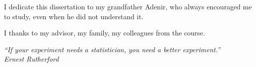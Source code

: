 \newpage

\begin{dedicatoria}
    \vspace*{\fill}
    \hfill
    \begin{minipage}{.6\textwidth}
        I dedicate this dissertation to my grandfather	Adenir, who always encouraged me to study, even
        when he did not understand it.
    \end{minipage}
\end{dedicatoria}
 
\begin{agradecimentos}
	I thanks to my advisor, my family, my colleagues from the course.  
\end{agradecimentos}

\begin{epigrafe}
\vspace*{\fill}

\begin{flushright}
    \hspace{7.5cm}
    \textit{
        ``If your experiment needs a statistician, you need a better
        experiment.''} \\
        \textit{Ernest Rutherford}
\end{flushright}
\end{epigrafe}